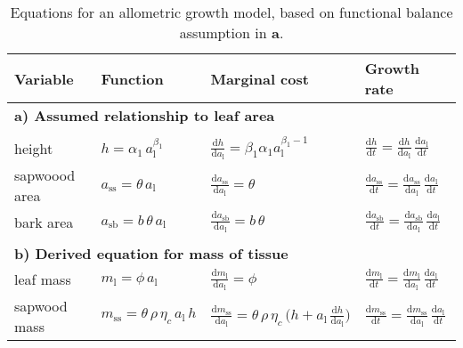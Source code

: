 \documentclass[12pt, a4paper]{article}
\begin{document}
\begin{table}[ht]
\caption{Equations for an allometric growth model, based on functional balance assumption in {\textbf a}. }
\centering

{\footnotesize  %
 \begin{doublespace}
  \begin{tabular}{p{2.5cm}p{3.5cm}p{5cm}p{4cm} }\\ \hline
  Variable & Function & Marginal cost & Growth rate\\ \hline
  \multicolumn{4}{l}{\textbf{a) Assumed relationship to leaf area}} \\ \\
  height &
    $h = \alpha_1 \, a_\textrm{l}^{\beta_1}$ &
    $\frac{\textrm{d}h}{\textrm{d}a_\textrm{l}} =  \beta_1 \alpha_1 a_\textrm{l}^{\beta_1-1}$ &
    $\frac{\textrm{d}h}{\textrm{d}t}  = \frac{\textrm{d}h}{\textrm{d}a_\textrm{l}} \, \frac{\textrm{d}a_\textrm{l}}{\textrm{d}t}$ \\
  sapwoood area &
    $a_\textrm{ss} = \theta \, a_\textrm{l}$ &
    $\frac{\textrm{d}a_\textrm{ss}}{\textrm{d} a_\textrm{l}} = \theta$ &
    $\frac{\textrm{d}a_\textrm{ss}}{\textrm{d}t}  =\frac{\textrm{d}a_\textrm{ss}}{\textrm{d} a_\textrm{l}} \, \frac{\textrm{d}a_\textrm{l}}{\textrm{d}t}$ \\
  bark area &
    $a_\textrm{sb} = b \, \theta \, a_\textrm{l}$ &
    $\frac{\textrm{d}a_\textrm{sb}}{\textrm{d} a_\textrm{l}} = b \, \theta$ &
    $\frac{\textrm{d}a_\textrm{sb}}{\textrm{d}t} = \frac{\textrm{d}a_\textrm{sb}}{\textrm{d} a_\textrm{l}} \, \frac{\textrm{d}a_\textrm{l}}{\textrm{d}t}$ \\  \\
  \multicolumn{4}{l}{\textbf{b) Derived equation for mass of tissue }} \\
  leaf mass &
    $m_\textrm{l} = \phi \, a_\textrm{l} $ &
    $\frac{\textrm{d}m_\textrm{l}}{\textrm{d}a_\textrm{l}} = \phi$ &
    $\frac{\textrm{d}m_\textrm{l}}{\textrm{d}t}  = \frac{\textrm{d}m_\textrm{l}}{\textrm{d}a_\textrm{l}}  \, \frac{\textrm{d}a_\textrm{l}}{\textrm{d}t}$ \\
  sapwood mass &
    $m_\textrm{ss} = \theta \, \rho \, \eta_c \, a_\textrm{l} \, h $ &
    $\frac{\textrm{d}m_\textrm{ss}}{\textrm{d}a_\textrm{l}} = \theta\, \rho\, \eta_c\, \big( h + a_\textrm{l}\, \frac{\textrm{d}h}{\textrm{d}a_\textrm{l}} \big)$ &
    $\frac{\textrm{d}m_\textrm{ss}}{\textrm{d}t}  = \frac{\textrm{d}m_\textrm{ss}}{\textrm{d}a_\textrm{l}} \, \frac{\textrm{d}a_\textrm{l}}{\textrm{d}t}$ \\

\end{tabular}
\end{doublespace}}
\end{table}
\end{document}
